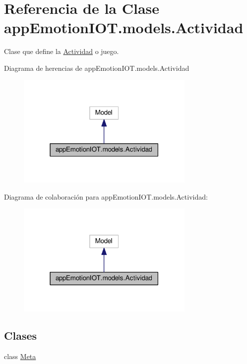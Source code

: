 \hypertarget{classappEmotionIOT_1_1models_1_1Actividad}{}\section{Referencia de la Clase app\+Emotion\+I\+O\+T.\+models.\+Actividad}
\label{classappEmotionIOT_1_1models_1_1Actividad}


Clase que define la \hyperlink{classappEmotionIOT_1_1models_1_1Actividad}{Actividad} o juego.  




Diagrama de herencias de app\+Emotion\+I\+O\+T.\+models.\+Actividad
\nopagebreak
\begin{figure}[H]
\begin{center}
\leavevmode
\includegraphics[width=243pt]{classappEmotionIOT_1_1models_1_1Actividad__inherit__graph}
\end{center}
\end{figure}


Diagrama de colaboración para app\+Emotion\+I\+O\+T.\+models.\+Actividad\+:
\nopagebreak
\begin{figure}[H]
\begin{center}
\leavevmode
\includegraphics[width=243pt]{classappEmotionIOT_1_1models_1_1Actividad__coll__graph}
\end{center}
\end{figure}
\subsection*{Clases}
\begin{DoxyCompactItemize}
\item 
class \hyperlink{classappEmotionIOT_1_1models_1_1Actividad_1_1Meta}{Meta}
\end{DoxyCompactItemize}
